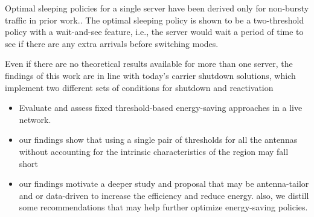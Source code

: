 Optimal sleeping policies for a single server have been derived only for non-bursty traffic in prior work.\cite{two_thresholds_traffic}.  The optimal sleeping policy is shown to be a two-threshold policy with a wait-and-see feature, i.e., the server would wait a period of time to see if there are any extra arrivals before switching modes.

Even if there are no theoretical results available for more than one server, the findings of this work are in line with today's carrier shutdown solutions, which implement two different sets of conditions for shutdown and reactivation \cite{data_driven_energy23}


\begin{table}[!t]
    \caption{Energy saving policies tested by the MNO. 
    } \label{tab:mno-trials}
    \vspace{-2mm}
\end{table}

\begin{itemize}
    \item Evaluate and assess fixed threshold-based energy-saving approaches in a live network.
    \item our findings show that using a single pair of thresholds for all the antennas without accounting for the intrinsic characteristics of the region may fall short
    \item our findings motivate a deeper study and proposal that may be antenna-tailor and or data-driven to increase the efficiency and reduce energy. also, we distill some recommendations that may help further optimize energy-saving policies.
\end{itemize}
